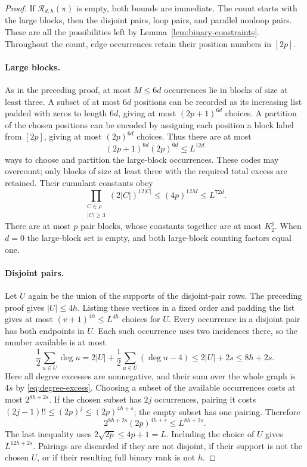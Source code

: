 \documentclass[11pt]{article}
\theoremstyle{definition}
\theoremstyle{remark}
\theoremstyle{plain}
\begin{document}
\begin{proof}
If $\mathcal R_{d,h}(\pi)$ is empty, both bounds are immediate.
The count starts with the large blocks, then the disjoint pairs, loop
pairs, and parallel nonloop pairs. These are all the possibilities
left by Lemma~\ref{lem:binary-constraints}. Throughout the count,
edge occurrences retain their position numbers in $[2p]$.

\paragraph{Large blocks.}
As in the preceding proof, at most $M\le6d$ occurrences lie in
blocks of size at least three. A subset of at most $6d$ positions
can be recorded as its increasing list padded with zeros to length
$6d$, giving at most $(2p+1)^{6d}$ choices. A partition of the
chosen positions can be encoded by assigning each position a block
label from $[2p]$, giving at most $(2p)^{6d}$ choices. Thus there
are at most
\[
                 (2p+1)^{6d}(2p)^{6d}\le L^{12d}
\]
ways to choose and partition the large-block occurrences. These codes
may overcount; only blocks of size at least three with the
required total excess are retained. Their cumulant constants obey
\[
 \prod_{\substack{C\in\rho\\|C|\ge3}}(2|C|)^{12|C|}
       \le(4p)^{12M}\le L^{72d}.
\]
There are at most $p$ pair blocks, whose constants together are at
most $K_2^p$. When $d=0$ the large-block set is empty, and both
large-block counting factors equal one.

\paragraph{Disjoint pairs.}
Let $U$ again be the union of the supports of the disjoint-pair
rows. The preceding proof gives $|U|\le4h$. Listing these vertices
in a fixed order and padding the list gives at most
$(v+1)^{4h}\le L^{4h}$ choices for $U$.
Every occurrence in a disjoint pair has both endpoints in $U$.
Each such occurrence uses two incidences there, so the number
available is at most
\[
 \frac12\sum_{u\in U}\deg u
 =2|U|+\frac12\sum_{u\in U}(\deg u-4)
 \le2|U|+2s\le8h+2s.
\]
Here all degree excesses are nonnegative, and their sum over the
whole graph is $4s$ by \eqref{eq:degree-excess}.
Choosing a subset of the available occurrences costs at most
$2^{8h+2s}$. If the chosen subset has $2j$ occurrences, pairing it
costs $(2j-1)!!\le(2p)^j\le(2p)^{4h+s}$; the empty subset
has one pairing. Therefore
\[
 2^{8h+2s}(2p)^{4h+s}\le L^{8h+2s}.
\]
The last inequality uses $2\sqrt{2p}\le4p+1=L$.
Including the choice of $U$ gives
$L^{12h+2s}$. Pairings are discarded if they are not disjoint, if their
support is not the chosen $U$, or if their resulting full binary
rank is not $h$.


\end{proof}
\end{document}
